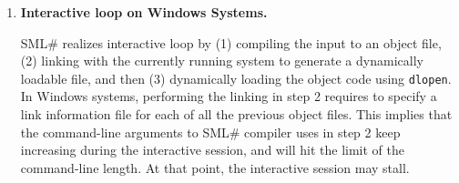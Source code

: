 \documentclass{jbook}
\newcommand{\smlsharp}{SML\#}
\begin{document}
\begin{enumerate}
\item {\bf Interactive loop on Windows Systems.}

	\smlsharp{} realizes interactive loop by (1) compiling the input
to an object file, (2) linking with the currently running system to
generate a dynamically loadable file, and then (3) dynamically loading
the object code using {\tt dlopen}. 
	In Windows systems, performing the linking in step 2 requires
to specify a link information file for each of all the previous object
files.
	This implies that the command-line arguments to \smlsharp{}
compiler uses in step 2 keep increasing during the interactive session,
and will hit the limit of the command-line length. 
	At that point, the interactive session may stall.

\end{enumerate}
\fi%
\end{document}
